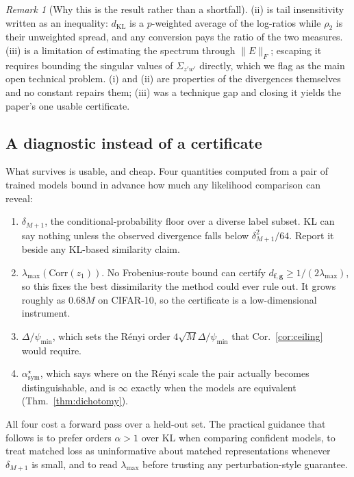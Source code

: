 \documentclass[10pt,letterpaper,twocolumn]{article}
\newcommand{\bff}{\mathbf{f}}
\newcommand{\bfg}{\mathbf{g}}
\newcommand{\dKL}{d_{\mathrm{KL}}}
\newcommand{\dfg}{d_{\bff,\bfg}}
\theoremstyle{plain}
\theoremstyle{definition}
\theoremstyle{remark}
\newtheorem{remark}[theorem]{Remark}
\begin{document}
\begin{remark}[Why this is the result rather than a shortfall]
\label{rem:whynot}
(ii) is tail insensitivity written as an inequality: $\dKL$ is a $p$-weighted
average of the log-ratios while $\rho_{2}$ is their unweighted spread, and any
conversion pays the ratio of the two measures. (iii) is a limitation of
estimating the spectrum through $\|E\|_{F}$; escaping it requires bounding the
singular values of $\Sigma_{z'w'}$ directly, which we flag as the main open
technical problem. (i) and (ii) are properties of the divergences themselves and no constant
repairs them; (iii) was a technique gap and closing it yields the paper's one
usable certificate.
\end{remark}

\subsection{A diagnostic instead of a certificate}
\label{sec:diagnostic}

What survives is usable, and cheap. Four quantities computed from a pair of
trained models bound in advance how much any likelihood comparison can reveal:

\begin{enumerate}[leftmargin=1.4em,itemsep=1pt,topsep=2pt]
\item $\delta_{M+1}$, the conditional-probability floor over a diverse label
      subset. KL can say nothing unless the observed divergence falls below
      $\delta_{M+1}^{2}/64$. Report it beside any KL-based similarity claim.
\item $\lambda_{\max}(\mathrm{Corr}(z_{1}))$. No Frobenius-route bound can
      certify $\dfg\ge1/(2\lambda_{\max})$, so this fixes the best dissimilarity
      the method could ever rule out. It grows roughly as $0.68M$ on CIFAR-10,
      so the certificate is a low-dimensional instrument.
\item $\Delta/\psi_{\min}$, which sets the R\'enyi order
      $4\sqrt{M}\Delta/\psi_{\min}$ that Cor.~\ref{cor:ceiling} would require.
\item $\alpha^{\star}_{\mathrm{sym}}$, which says where on the R\'enyi scale
      the pair actually becomes distinguishable, and is $\infty$ exactly when
      the models are equivalent (Thm.~\ref{thm:dichotomy}).
\end{enumerate}

All four cost a forward pass over a held-out set. The practical guidance that
follows is to prefer orders $\alpha>1$ over KL when comparing confident models,
to treat matched loss as uninformative about matched representations whenever
$\delta_{M+1}$ is small, and to read $\lambda_{\max}$ before trusting any
perturbation-style guarantee.
\end{document}
